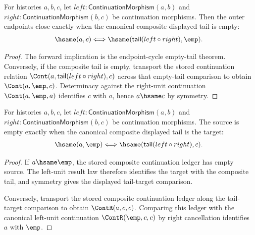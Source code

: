 \begin{theorem}
\label{thm:continuation-morphism-comp-endpoint-cycle-tail-empty-iff}
For histories $a,b,c$, let $left:\mathsf{ContinuationMorphism}(a,b)$ and
$right:\mathsf{ContinuationMorphism}(b,c)$ be continuation morphisms. Then the
outer endpoints close exactly when the canonical composite displayed tail is
empty:
$$
\hsame(a,c)\Longleftrightarrow
\hsame(\mathsf{tail}(left\circ right),\emp).
$$
\end{theorem}
\begin{proof}
The forward implication is the endpoint-cycle empty-tail theorem. Conversely,
if the composite tail is empty, transport the stored continuation relation
$\Cont(a,\mathsf{tail}(left\circ right),c)$ across that empty-tail comparison
to obtain $\Cont(a,\emp,c)$. Determinacy against the right-unit continuation
$\Cont(a,\emp,a)$ identifies $c$ with $a$, hence $a\hsame c$ by symmetry.
\end{proof}

\begin{theorem}
\label{thm:continuation-morphism-comp-source-empty-tail-target-iff}
For histories $a,b,c$, let $left:\mathsf{ContinuationMorphism}(a,b)$ and
$right:\mathsf{ContinuationMorphism}(b,c)$ be continuation morphisms. The
source is empty exactly when the canonical composite displayed tail is the
target:
$$
\hsame(a,\emp)\Longleftrightarrow
\hsame(\mathsf{tail}(left\circ right),c).
$$
\end{theorem}
\begin{proof}
If $a\hsame\emp$, the stored composite continuation ledger has empty source.
The left-unit result law therefore identifies the target with the composite
tail, and symmetry gives the displayed tail-target comparison.

Conversely, transport the stored composite continuation ledger along the
tail-target comparison to obtain $\ContR(a,c,c)$. Comparing this ledger with
the canonical left-unit continuation $\ContR(\emp,c,c)$ by right cancellation
identifies $a$ with $\emp$.
\end{proof}

